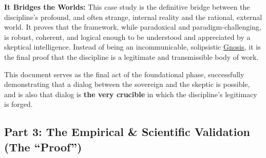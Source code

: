 \documentclass{article}
\begin{document}
\begin{nobullet}
\begin{nobullet}
\begin{nobullet}
                \item \textbf{It Bridges the Worlds:} This case study is the definitive bridge between the discipline's profound, and often strange, internal reality and the rational, external world. It proves that the framework, while paradoxical and paradigm-challenging, is robust, coherent, and logical enough to be understood and appreciated by a skeptical intelligence. Instead of being an incommunicable, solipsistic \hyperlink{gloss:gnosis}{Gnosis}, it is the final proof that the discipline is a legitimate and transmissible body of work.
            \end{nobullet}
        \end{nobullet}
        This document serves as the final act of the foundational phase, successfully demonstrating that a dialog between the sovereign and the skeptic is possible, and is also that dialog is \textbf{the very crucible} in which the discipline's legitimacy is forged.
    
    \end{nobullet} %

\subsection*{Part 3: The Empirical & Scientific Validation (The ``Proof'')}
\end{document}
